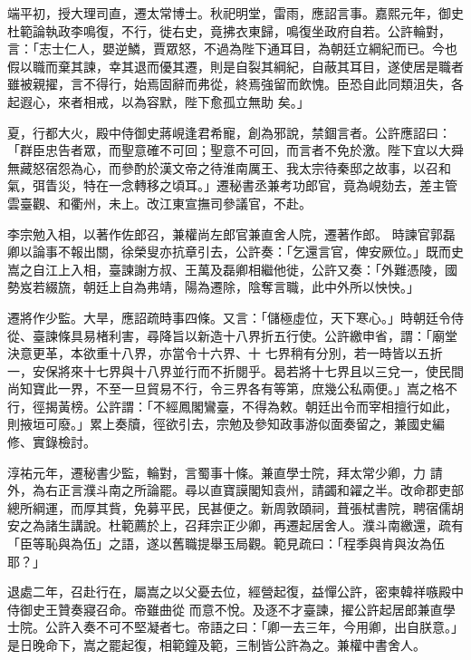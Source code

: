 \begin{pinyinscope}
 端平初，授大理司直，遷太常博士。秋祀明堂，雷雨，應詔言事。嘉熙元年，御史杜範論執政李鳴復，不行，徙右史，竟拂衣東歸，鳴復坐政府自若。公許輪對，言：「志士仁人，嬰逆鱗，賈眾怒，不過為陛下通耳目，為朝廷立綱紀而已。今也假以職而棄其諫，幸其退而優其遷，則是自裂其綱紀，自蔽其耳目，遂使居是職者雖被親擢，言不得行，始焉固辭而弗從，終焉強留而飲愧。臣恐自此同類沮失，各起遐心，來者相戒，以為容默，陛下愈孤立無助
 矣。」



 夏，行都大火，殿中侍御史蔣峴逢君希寵，創為邪說，禁錮言者。公許應詔曰：「群臣忠告者眾，而聖意確不可回；聖意不可回，而言者不免於激。陛下宜以大舜無藏怒宿怨為心，而參酌於漢文帝之待淮南厲王、我太宗待秦邸之故事，以召和氣，弭眚災，特在一念轉移之頃耳。」遷秘書丞兼考功郎官，竟為峴劾去，差主管雲臺觀、和衢州，未上。改江東宣撫司參議官，不赴。



 李宗勉入相，以著作佐郎召，兼權尚左郎官兼直舍人院，遷著作郎。
 時諫官郭磊卿以論事不報出關，徐榮叟亦抗章引去，公許奏：「乞還言官，俾安厥位。」既而史嵩之自江上入相，臺諫謝方叔、王萬及磊卿相繼他徙，公許又奏：「外難憑陵，國勢岌若綴旒，朝廷上自為弗靖，陽為遷除，陰奪言職，此中外所以怏怏。」



 遷將作少監。大旱，應詔疏時事四條。又言：「儲極虛位，天下寒心。」時朝廷令侍從、臺諫條具易楮利害，尋降旨以新造十八界折五行使。公許繳申省，謂：「廟堂決意更革，本欲重十八界，亦當令十六界、十
 七界稍有分別，若一時皆以五折一，安保將來十七界與十八界並行而不折閱乎。曷若將十七界且以三兌一，使民間尚知寶此一界，不至一旦貿易不行，令三界各有等第，庶幾公私兩便。」嵩之格不行，徑揭黃榜。公許謂：「不經鳳閣鸞臺，不得為敕。朝廷出令而宰相擅行如此，則掖垣可廢。」累上奏牘，徑欲引去，宗勉及參知政事游似面奏留之，兼國史編修、實錄檢討。



 淳祐元年，遷秘書少監，輪對，言蜀事十條。兼直學士院，拜太常少卿，力
 請外，為右正言濮斗南之所論罷。尋以直寶謨閣知袁州，請蠲和糴之半。改命郡吏部總所綱運，而厚其貲，免募平民，民甚便之。新周敦頤祠，葺張栻書院，聘宿儒胡安之為諸生講說。杜範薦於上，召拜宗正少卿，再遷起居舍人。濮斗南繳還，疏有「臣等恥與為伍」之語，遂以舊職提舉玉局觀。範見疏曰：「程季與肯與汝為伍耶？」



 退處二年，召赴行在，屬嵩之以父憂去位，經營起復，益憚公許，密柬韓祥嗾殿中侍御史王贊奏寢召命。帝雖曲從
 而意不悅。及逐不才臺諫，擢公許起居郎兼直學士院。公許入奏不可不堅凝者七。帝語之曰：「卿一去三年，今用卿，出自朕意。」是日晚命下，嵩之罷起復，相範鐘及範，三制皆公許為之。兼權中書舍人。




\end{pinyinscope}
